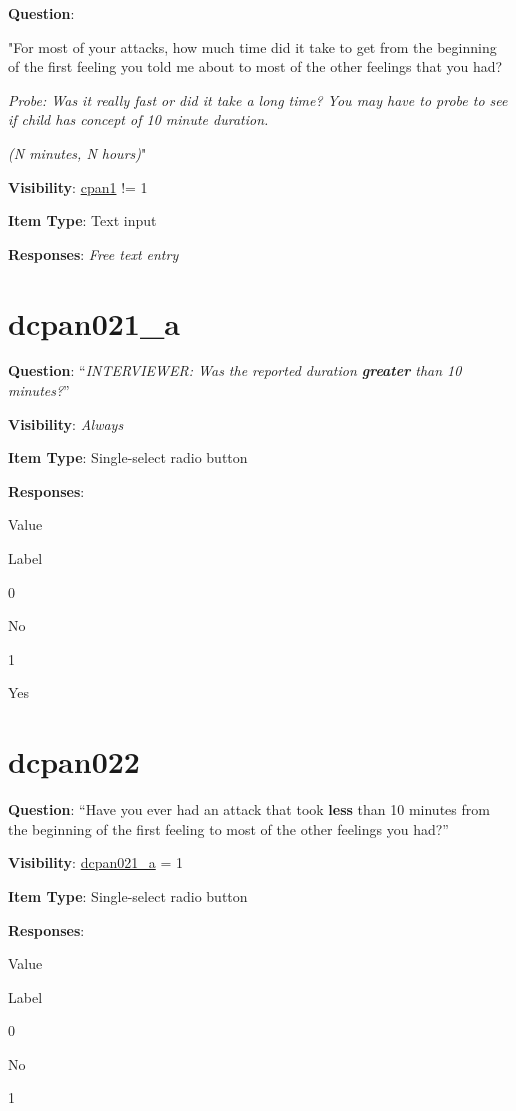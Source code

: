 \documentclass[]{book}
\begin{document}
\textbf{Question}:

"For most of your attacks, how much time did it take to get from the beginning of the first feeling you told me about to most of the other feelings that you had?

\emph{Probe: Was it really fast or did it take a long time? You may have to probe to see if child has concept of 10 minute duration.}

\emph{(N minutes, N hours)}"

\textbf{Visibility}: \protect\hyperlink{cpan1}{cpan1} != 1

\textbf{Item Type}: Text input

\textbf{Responses}: \emph{Free text entry}

\hypertarget{dcpan021_a}{%
\section{dcpan021\_a}\label{dcpan021_a}}

\textbf{Question}: ``\emph{INTERVIEWER: Was the reported duration \textbf{greater} than 10 minutes?}''

\textbf{Visibility}: \emph{Always}

\textbf{Item Type}: Single-select radio button

\textbf{Responses}:

Value

Label

0

No

1

Yes

\hypertarget{dcpan022}{%
\section{dcpan022}\label{dcpan022}}

\textbf{Question}: ``Have you ever had an attack that took \textbf{less} than 10 minutes from the beginning of the first feeling to most of the other feelings you had?''

\textbf{Visibility}: \protect\hyperlink{dcpan021_a}{dcpan021\_a} = 1

\textbf{Item Type}: Single-select radio button

\textbf{Responses}:

Value

Label

0

No

1
\end{document}
